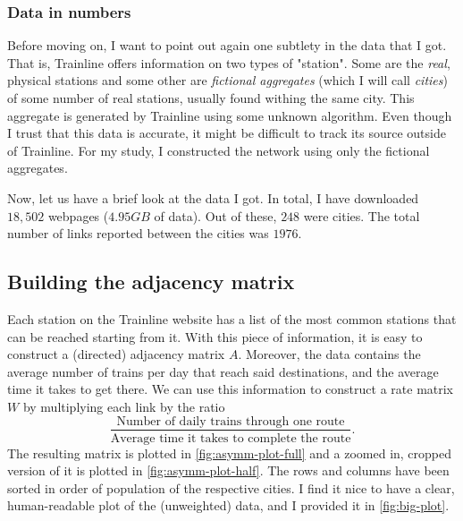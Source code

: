 \subsubsection{Data in numbers}
\label{subsubsec:data-in-numbers}
Before moving on, I want to point out again one subtlety in the data that I got. That is, Trainline offers information on two types of "station". Some are the \emph{real}, physical stations and some other are \emph{fictional aggregates} (which I will call \emph{cities}) of some number of real stations, usually found withing the same city.
This aggregate is generated by Trainline using some unknown algorithm. Even though I trust that this data is accurate, it might be difficult to track its source outside of Trainline.
For my study, I constructed the network using only the fictional aggregates.


Now, let us have a brief look at the data I got. 
In total, I have downloaded $18,502$ webpages ($4.95GB$ of data). Out of these, $248$ were cities. The total number of links reported between the cities was $1976$.


\subsection{Building the adjacency matrix}
Each station on the Trainline website has a list of the most common stations that can be reached starting from it. With this piece of information, it is easy to construct a (directed) adjacency matrix $A$. Moreover, the data contains the average number of trains per day that reach said destinations, and the average time it takes to get there. We can use this information to construct a rate matrix $W$ by multiplying each link by the ratio
\begin{equation*}
    \frac{\text{Number of daily trains through one route}}{\text{Average time it takes to complete the route}}.
\end{equation*}
The resulting matrix is plotted in \autoref{fig:asymm-plot-full} and a zoomed in, cropped version of it is plotted in \autoref{fig:asymm-plot-half}. The rows and columns have been sorted in order of population of the respective cities.
I find it nice to have a clear, human-readable plot of the (unweighted) data, and I provided it in \autoref{fig:big-plot}.

